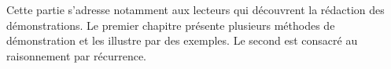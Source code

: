 \documentclass[../../include/open-logic-part]{subfiles}
\begin{document}

Cette partie s'adresse notamment aux lecteurs qui découvrent la
rédaction des démonstrations. Le premier chapitre présente plusieurs
méthodes de démonstration et les illustre par des exemples.
Le second est consacré au raisonnement par récurrence.



\OLEndPartHook
\end{document}
